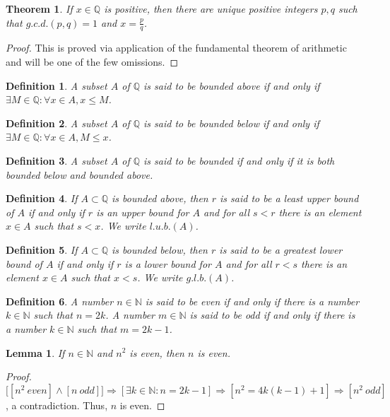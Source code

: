 \documentclass[crop=false,class=book]{standalone}
\theoremstyle{mystyle}
\newtheorem{theorem}{Theorem}[section]
\newtheorem{definition}{Definition}[section]
\newtheorem{lemma}{Lemma}[section]
\begin{document}
\begin{theorem}
If $x\in \mathbb{Q}$ is positive, then there are unique positive integers $p, q$ such that $g.c.d.(p,q)=1$ and $x=\frac{p}{q}$.
\end{theorem}
\begin{proof}
This is proved via application of the fundamental theorem of arithmetic and will be one of the few omissions.
\end{proof}
\begin{definition}
A subset $A$ of $\mathbb{Q}$ is said to be bounded above if and only if $\exists M\in \mathbb{Q}: \forall x\in A,x \leq M$.
\end{definition}
\begin{definition}
A subset $A$ of $\mathbb{Q}$ is said to be bounded below if and only if $\exists M\in \mathbb{Q}:\forall x\in A,M\leq x$. 
\end{definition}
\begin{definition}
A subset $A$ of $\mathbb{Q}$ is said to be bounded if and only if it is both bounded below and bounded above.
\end{definition}
\begin{definition}
If $A\subset \mathbb{Q}$ is bounded above, then $r$ is said to be a least upper bound of $A$ if and only if $r$ is an upper bound for $A$ and for all $s<r$ there is an element $x\in A$ such that $s<x$. We write $l.u.b.(A)$.
\end{definition}
\begin{definition}
If $A\subset \mathbb{Q}$ is bounded below, then $r$ is said to be a greatest lower bound of $A$ if and only if $r$ is a lower bound for $A$ and for all $r<s$ there is an element $x\in A$ such that $x<s$. We write $g.l.b.(A)$.
\end{definition}
\begin{definition}
A number $n\in \mathbb{N}$ is said to be even if and only if there is a number $k\in \mathbb{N}$ such that $n=2k$. A number $m\in \mathbb{N}$ is said to be odd if and only if there is a number $k\in \mathbb{N}$ such that $m=2k-1$.
\end{definition}
\begin{lemma}
If $n\in \mathbb{N}$ and $n^2$ is even, then $n$ is even.
\end{lemma}
\begin{proof}
$\big[[n^2\ even]\land [n\ odd]\big]\Rightarrow [\exists k\in \mathbb{N}:n=2k-1]\Rightarrow [n^2 = 4k(k-1)+1]\Rightarrow [n^2\ odd]$, a contradiction. Thus, $n$ is even.
\end{proof}
\end{document}
